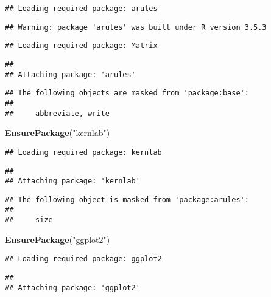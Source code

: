 \documentclass[]{article}
\newenvironment{Shaded}{\begin{snugshade}}{\end{snugshade}}
\newcommand{\KeywordTok}[1]{\textcolor[rgb]{0.13,0.29,0.53}{\textbf{#1}}}
\newcommand{\StringTok}[1]{\textcolor[rgb]{0.31,0.60,0.02}{#1}}
\newcommand{\NormalTok}[1]{#1}
\begin{document}
\begin{verbatim}
## Loading required package: arules
\end{verbatim}

\begin{verbatim}
## Warning: package 'arules' was built under R version 3.5.3
\end{verbatim}

\begin{verbatim}
## Loading required package: Matrix
\end{verbatim}

\begin{verbatim}
## 
## Attaching package: 'arules'
\end{verbatim}

\begin{verbatim}
## The following objects are masked from 'package:base':
## 
##     abbreviate, write
\end{verbatim}

\begin{Shaded}
\begin{Highlighting}[]
\KeywordTok{EnsurePackage}\NormalTok{(}\StringTok{"kernlab"}\NormalTok{)}
\end{Highlighting}
\end{Shaded}

\begin{verbatim}
## Loading required package: kernlab
\end{verbatim}

\begin{verbatim}
## 
## Attaching package: 'kernlab'
\end{verbatim}

\begin{verbatim}
## The following object is masked from 'package:arules':
## 
##     size
\end{verbatim}

\begin{Shaded}
\begin{Highlighting}[]
\KeywordTok{EnsurePackage}\NormalTok{(}\StringTok{"ggplot2"}\NormalTok{)}
\end{Highlighting}
\end{Shaded}

\begin{verbatim}
## Loading required package: ggplot2
\end{verbatim}

\begin{verbatim}
## 
## Attaching package: 'ggplot2'
\end{verbatim}
\end{document}
